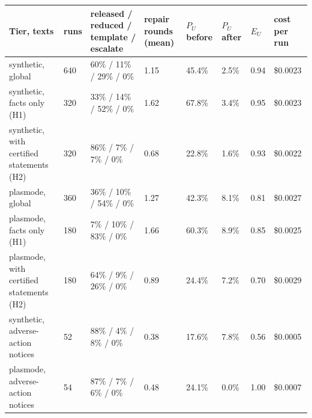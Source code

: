\begin{tabular}{p{4cm}p{1cm}p{2.3cm}p{1.1cm}p{1.2cm}p{1.2cm}p{1cm}p{1.2cm}}
\toprule
\textbf{Tier, texts} & \textbf{runs} & \textbf{released / reduced / template / escalate} & \textbf{repair rounds (mean)} & \textbf{$P_U$ before} & \textbf{$P_U$ after} & \textbf{$E_U$} & \textbf{cost per run} \\
\midrule
synthetic, global & 640 & 60\% / 11\% / 29\% / 0\% & 1.15 & 45.4\% & 2.5\% & 0.94 & \$0.0023 \\
synthetic, facts only (H1) & 320 & 33\% / 14\% / 52\% / 0\% & 1.62 & 67.8\% & 3.4\% & 0.95 & \$0.0023 \\
synthetic, with certified statements (H2) & 320 & 86\% / 7\% / 7\% / 0\% & 0.68 & 22.8\% & 1.6\% & 0.93 & \$0.0022 \\
plasmode, global & 360 & 36\% / 10\% / 54\% / 0\% & 1.27 & 42.3\% & 8.1\% & 0.81 & \$0.0027 \\
plasmode, facts only (H1) & 180 & 7\% / 10\% / 83\% / 0\% & 1.66 & 60.3\% & 8.9\% & 0.85 & \$0.0025 \\
plasmode, with certified statements (H2) & 180 & 64\% / 9\% / 26\% / 0\% & 0.89 & 24.4\% & 7.2\% & 0.70 & \$0.0029 \\
synthetic, adverse-action notices & 52 & 88\% / 4\% / 8\% / 0\% & 0.38 & 17.6\% & 7.8\% & 0.56 & \$0.0005 \\
plasmode, adverse-action notices & 54 & 87\% / 7\% / 6\% / 0\% & 0.48 & 24.1\% & 0.0\% & 1.00 & \$0.0007 \\
\bottomrule
\end{tabular}
